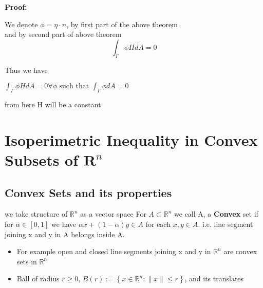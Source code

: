 \documentclass[oneside]{book}
\begin{document}
\textbf{Proof: }  

We denote 
$\phi = \eta\cdot{n}$,
by first part of the above theorem \\ 

and by second part of above theorem 
$$\int_{\Gamma} \phi H d A=0$$

Thus we have \\

\begin{center}
   $ \int_{\Gamma} \phi H d A=0 \forall \phi \text { such that } \int_{\Gamma} \phi d A=0$ \\ 
\end{center}
from here H will be a constant 

\chapter{Isoperimetric Inequality in Convex Subsets of $\mathbf{R}^{n}$ }
  \label{chap:c4}










































\section{Convex Sets and its properties } \label{s:1}
we take structure of  $\mathbb{R}^n$ as a vector space 
For $ A \subset \mathbb{R}^n$ we call A, a \textbf{Convex} set  if for $\alpha \in [0,1]$ we have $\alpha x +(1- \alpha)y \in A $ for each  $x, y \in A.$  i.e. line segment joining x and y in A belongs inside A.\\
\begin{itemize}
    \item  For example open and closed line segments joining x and y in $\mathbb{R}^n$ are convex sets in $\mathbb{R}^n$

\item  

 Ball of radius $r \geq 0$,  $B (r):=\left\{x \in \mathbb{R}^{n}:\|x\| \leq r\right\}$,  and its translates
 
 \end{itemize}
\end{document}
